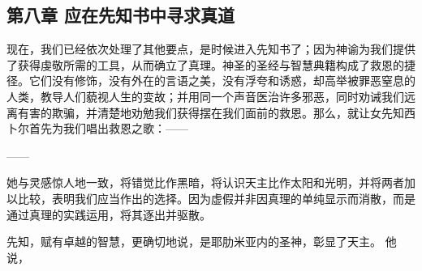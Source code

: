 \subsection{第八章 应在先知书中寻求真道}

现在，我们已经依次处理了其他要点，是时候进入先知书了；因为神谕为我们提供了获得虔敬所需的工具，从而确立了真理。神圣的圣经与智慧典籍构成了救恩的捷径。它们没有修饰，没有外在的言语之美，没有浮夸和诱惑，却高举被罪恶窒息的人类，教导人们藐视人生的变故；并用同一个声音医治许多邪恶，同时劝诫我们远离有害的欺骗，并清楚地劝勉我们获得摆在我们面前的救恩。那么，就让女先知西卜尔首先为我们唱出救恩之歌：——\par

——\par

她与灵感惊人地一致，将错觉比作黑暗，将认识天主比作太阳和光明，并将两者加以比较，表明我们应当作出的选择。因为虚假并非因真理的单纯显示而消散，而是通过真理的实践运用，将其逐出并驱散。\par

先知，赋有卓越的智慧，更确切地说，是耶肋米亚内的圣神，彰显了天主。 他说， \par

